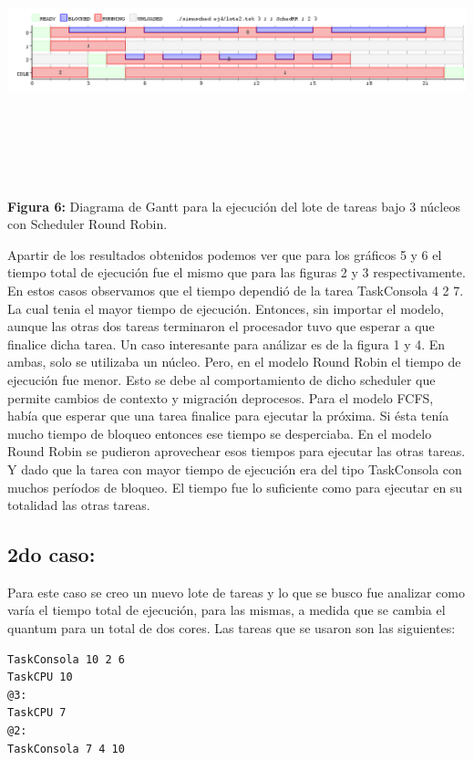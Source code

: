 \documentclass[a4paper]{article}
\begin{document}
  \includegraphics[width=\textwidth,height=3.0in,keepaspectratio
]{imagenes/ej4/3core.png} \newline
\begin {flushleft}
\textbf{Figura 6:} Diagrama de Gantt para la ejecuci\'on del lote de tareas bajo 3 n\'ucleos con Scheduler Round Robin.
\end{flushleft}
 
Apartir de los resultados obtenidos podemos ver que para los gráficos 5 y 6 el tiempo total de ejecución fue el mismo que para las figuras 2 y 3 respectivamente. En estos casos observamos que el tiempo dependió de la tarea TaskConsola 4 2 7. La cual tenia el mayor tiempo de ejecución. Entonces, sin importar el modelo, aunque las otras dos tareas terminaron el procesador tuvo que esperar a que finalice dicha tarea. Un caso interesante para análizar es de la figura 1 y 4. En ambas, solo se utilizaba un núcleo. Pero, en el modelo Round Robin el tiempo de ejecución fue menor. Esto se debe al comportamiento de dicho scheduler que permite cambios de contexto y migración deprocesos. Para el modelo FCFS, había que esperar que una tarea finalice para ejecutar la próxima. Si ésta tenía mucho tiempo de bloqueo entonces ese tiempo se desperciaba. En el modelo Round Robin se pudieron aprovechear esos tiempos para ejecutar las otras tareas. Y dado que la tarea con mayor tiempo de ejecución era del tipo TaskConsola con muchos períodos de bloqueo. El tiempo fue lo suficiente como para ejecutar en su totalidad las otras tareas.  
 \bigskip
 
 \subsection{2do caso:}
 
 Para este caso se creo un nuevo lote de tareas y lo que se busco fue analizar como varía el tiempo total de ejecución, para las mismas, a medida que se cambia el quantum para un total de dos cores.\newline 
 Las tareas que se usaron son las siguientes:\newline
 \begin{codesnippet}
	\begin{verbatim}
TaskConsola 10 2 6
TaskCPU 10
@3:
TaskCPU 7
@2:
TaskConsola 7 4 10
	\end{verbatim}
	\end{codesnippet}
\end{document}
